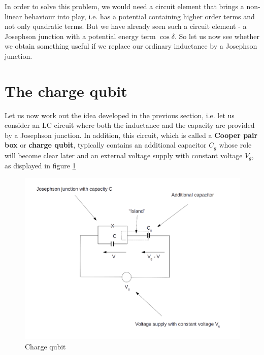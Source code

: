 \documentclass[a4paper, draft]{article}
\theoremstyle{own}
\theoremstyle{remark}
\begin{document}
In order to solve this problem, we would need a circuit element that brings a non-linear behaviour into play, i.e. has a potential containing higher order terms and not only quadratic terms. But we have already seen such a circuit element - a Josephson junction with a potential energy term $\cos \delta$. So let us now see whether we obtain something useful if we replace our ordinary inductance by a Josephson junction. 

\section{The charge qubit}

Let us now work out the idea developed in the previous section, i.e. let us consider an LC circuit where both the inductance and the capacity are provided by a Josephson junction. In addition, this circuit, which is called a {\bf Cooper pair box} or {\bf charge qubit}, typically contains an additional capacitor $C_g$ whose role will become clear later and an external voltage supply with constant voltage $V_g$, as displayed in figure \ref{fig:ChargeQubit}

\begin{figure}[ht]
\centering
\includegraphics[width=0.9\linewidth]{images/ChargeQubit}
\caption[Charge qubit]{Charge qubit}
\label{fig:ChargeQubit}
\end{figure}
\end{document}
